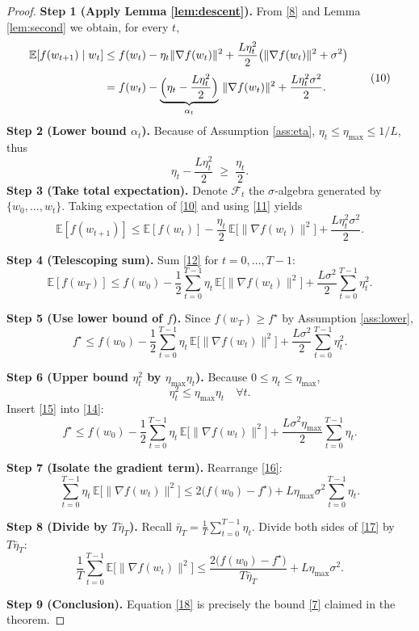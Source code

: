 \documentclass{article}
\begin{document}
\begin{proof}
\textbf{Step 1 (Apply Lemma \ref{lem:descent}).}  
From \eqref{8} and Lemma \ref{lem:second} we obtain, for every $t$,
\[
\begin{aligned}
\mathbb{E}[f(w_{t+1})\mid w_t]
&\le f(w_t)-\eta_t\|\nabla f(w_t)\|^2
+\frac{L\eta_t^2}{2}\big(\|\nabla f(w_t)\|^2+\sigma^2\big)\\[1mm]
&= f(w_t)-\underbrace{\Bigl(\eta_t-\frac{L\eta_t^2}{2}\Bigr)}_{\alpha_t}\,\|\nabla f(w_t)\|^2
+\frac{L\eta_t^2\sigma^2}{2}.
\end{aligned}
\tag{10}
\]
\textbf{Step 2 (Lower bound $\alpha_t$).}  
Because of Assumption \ref{ass:eta}, $\eta_t\le\eta_{\max}\le 1/L$, thus
\[
\eta_t-\frac{L\eta_t^2}{2}\;\ge\;\frac{\eta_t}{2}.
\tag{11}
\]
\textbf{Step 3 (Take total expectation).}  
Denote $\mathcal{F}_t$ the $\sigma$‑algebra generated by $\{w_0,\dots,w_t\}$.  Taking expectation of \eqref{10} and using \eqref{11} yields
\[
\mathbb{E}[f(w_{t+1})]\le 
\mathbb{E}[f(w_t)]-\frac{\eta_t}{2}\,\mathbb{E}\big[\|\nabla f(w_t)\|^2\big]
+\frac{L\eta_t^2\sigma^2}{2}.
\tag{12}
\]

\textbf{Step 4 (Telescoping sum).}  
Sum \eqref{12} for $t=0,\dots,T-1$:
\[
\mathbb{E}[f(w_T)]\le f(w_0)-\frac{1}{2}\sum_{t=0}^{T-1}\eta_t\,
\mathbb{E}\big[\|\nabla f(w_t)\|^2\big]
+\frac{L\sigma^2}{2}\sum_{t=0}^{T-1}\eta_t^2 .
\tag{13}
\]

\textbf{Step 5 (Use lower bound of $f$).}  
Since $f(w_T)\ge f^\star$ by Assumption \ref{ass:lower},
\[
f^\star\le f(w_0)-\frac{1}{2}\sum_{t=0}^{T-1}\eta_t\,
\mathbb{E}\big[\|\nabla f(w_t)\|^2\big]
+\frac{L\sigma^2}{2}\sum_{t=0}^{T-1}\eta_t^2 .
\tag{14}
\]

\textbf{Step 6 (Upper bound $\eta_t^2$ by $\eta_{\max}\eta_t$).}  
Because $0\le\eta_t\le\eta_{\max}$,
\[
\eta_t^2\le\eta_{\max}\eta_t\quad\forall t.
\tag{15}
\]
Insert \eqref{15} into \eqref{14}:
\[
f^\star\le f(w_0)-\frac{1}{2}\sum_{t=0}^{T-1}\eta_t\,
\mathbb{E}\big[\|\nabla f(w_t)\|^2\big]
+\frac{L\sigma^2\eta_{\max}}{2}\sum_{t=0}^{T-1}\eta_t .
\tag{16}
\]

\textbf{Step 7 (Isolate the gradient term).}  
Rearrange \eqref{16}:
\[
\sum_{t=0}^{T-1}\eta_t\,
\mathbb{E}\big[\|\nabla f(w_t)\|^2\big]
\le
2\big(f(w_0)-f^\star\big)
+L\eta_{\max}\sigma^2\sum_{t=0}^{T-1}\eta_t .
\tag{17}
\]

\textbf{Step 8 (Divide by $T\bar\eta_T$).}  
Recall $\bar\eta_T=\frac{1}{T}\sum_{t=0}^{T-1}\eta_t$.  Divide both sides of \eqref{17} by $T\bar\eta_T$:
\[
\frac{1}{T}\sum_{t=0}^{T-1}\mathbb{E}\big[\|\nabla f(w_t)\|^2\big]
\le
\frac{2\big(f(w_0)-f^\star\big)}{T\bar\eta_T}
+L\eta_{\max}\sigma^2 .
\tag{18}
\]

\textbf{Step 9 (Conclusion).}  
Equation \eqref{18} is precisely the bound \eqref{7} claimed in the theorem. \hfill\qedsymbol
\end{proof}
\end{document}

